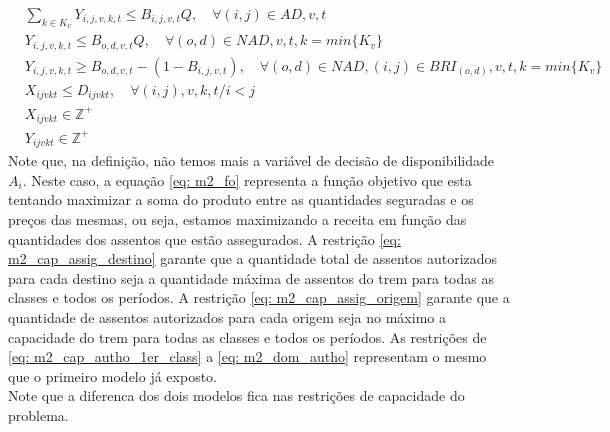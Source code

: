 \begin{align}
	 & \sum_{k \in K_v}Y_{i,j,v,k,t} \leq B_{i,j,v,t} Q, \quad  \forall (i,j)\in AD,v,t                                                                         \label{eq: m2_autho_activ_adj}                                                                                   \\
	 & Y_{i,j,v,k,t} \leq B_{o,d,v,t} Q, \quad  \forall (o,d)\in NAD, v, t, k = min\{K_v\}                                                                       \label{eq: m2_autho_activ_noadj}                                                                                \\
	 & Y_{i,j,v,k,t} \geq B_{o,d,v,t} - (1-B_{i,j,v,t}), \quad  \forall (o,d)\in NAD, (i,j) \in BRI_{(o,d)}, v,t, k = min\{K_v\}                                                                       \label{eq: m2_autho_activ_noadj}                                          \\
	 & X_{ijvkt} \leq D_{ijvkt},  \quad \forall (i,j),v,k,t/ i < j                                                                                             \label{eq: m2_assig_menor_dem}                                                                                    \\[15pt]
	 & X_{ijvkt} \in \mathbb{Z}^+                                                                                                                              \label{eq: m2_dom_assig}                                                                                          \\
	 & Y_{ijvkt} \in \mathbb{Z}^+                                                                                                                              \label{eq: m2_dom_autho}
\end{align}
Note que, na definição, não temos mais a variável de decisão de disponibilidade \(A_i\). Neste caso, a equação \ref{eq: m2_fo} representa a função objetivo que esta tentando maximizar a soma do produto entre as quantidades seguradas e os preços das mesmas, ou seja, estamos maximizando a receita em função das quantidades dos assentos que estão assegurados.
A restrição \ref{eq: m2_cap_assig_destino} garante que a quantidade total de assentos autorizados para cada destino seja a quantidade máxima de assentos do trem para todas as classes e todos os períodos.
A restrição \ref{eq: m2_cap_assig_origem} garante que a quantidade de assentos autorizados para cada origem seja no máximo a capacidade do trem para todas as classes e todos os períodos.
As restrições de \ref{eq: m2_cap_autho_1er_class} a \ref{eq: m2_dom_autho} representam o mesmo que o primeiro modelo já exposto.\\
Note que a diferenca dos dois modelos fica nas restrições de capacidade do problema.